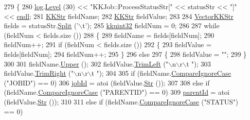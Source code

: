 \begin{DoxyCode}
279 \{
280   \hyperlink{class_k_k_job_managment_1_1_k_k_job_ad2466a68d9a01778e0f08af0478b94e5}{log}.\hyperlink{class_k_k_b_1_1_run_log_a32cf761d7f2e747465fd80533fdbb659}{Level} (30) << \textcolor{stringliteral}{"KKJob::ProcessStatusStr["} << statusStr << \textcolor{stringliteral}{"]"} << 
      \hyperlink{namespace_k_k_b_ad1f50f65af6adc8fa9e6f62d007818a8}{endl};
281   \hyperlink{class_k_k_b_1_1_k_k_str}{KKStr}  fieldName;
282   \hyperlink{class_k_k_b_1_1_k_k_str}{KKStr}  fieldValue;
283 
284   \hyperlink{class_k_k_b_1_1_vector_k_k_str}{VectorKKStr} fields = statusStr.\hyperlink{class_k_k_b_1_1_k_k_str_ac06a219a8773d97383baef7cb10ab091}{Split} (\textcolor{charliteral}{'\(\backslash\)t'});
285   \hyperlink{namespace_k_k_b_af8d832f05c54994a1cce25bd5743e19a}{kkuint32}  fieldNum = 0;
286 
287   \textcolor{keywordflow}{while}  (fieldNum < fields.size ())
288   \{
289     fieldName = fields[fieldNum];
290     fieldNum++;
291     \textcolor{keywordflow}{if}  (fieldNum < fields.size ())
292     \{
293       fieldValue = fields[fieldNum];
294       fieldNum++;
295     \}
296     \textcolor{keywordflow}{else}
297     \{
298       fieldValue = \textcolor{stringliteral}{""};
299     \}
300 
301     fieldName.\hyperlink{class_k_k_b_1_1_k_k_str_a66ea0feabc94da88591b56a683695bd9}{Upper} ();
302     fieldValue.\hyperlink{class_k_k_b_1_1_k_k_str_af7c102c53103ddff3f48270b4a198c89}{TrimLeft} (\textcolor{stringliteral}{"\(\backslash\)n\(\backslash\)r\(\backslash\)t "});
303     fieldValue.\hyperlink{class_k_k_b_1_1_k_k_str_aa912161f17871e2d6fec7bbac033221c}{TrimRight} (\textcolor{stringliteral}{"\(\backslash\)n\(\backslash\)r\(\backslash\)t "});
304 
305     \textcolor{keywordflow}{if}  (fieldName.\hyperlink{class_k_k_b_1_1_k_k_str_a3fd779d448f27e24170c9c05fca5208e}{CompareIgnoreCase} (\textcolor{stringliteral}{"JOBID"}) == 0)
306       \hyperlink{class_k_k_job_managment_1_1_k_k_job_a655535952219853be0aea068e60c974b}{jobId} = atoi (fieldValue.\hyperlink{class_k_k_b_1_1_k_k_str_ad574e6c0fe7f6ce1ba3ab0a8ce2fbd52}{Str} ());
307 
308     \textcolor{keywordflow}{else}  \textcolor{keywordflow}{if}  (fieldName.\hyperlink{class_k_k_b_1_1_k_k_str_a3fd779d448f27e24170c9c05fca5208e}{CompareIgnoreCase} (\textcolor{stringliteral}{"PARENTID"}) == 0)
309       \hyperlink{class_k_k_job_managment_1_1_k_k_job_a2623203d948d2e6348f7edc572e6abb4}{parentId} = atoi (fieldValue.\hyperlink{class_k_k_b_1_1_k_k_str_ad574e6c0fe7f6ce1ba3ab0a8ce2fbd52}{Str} ());
310 
311     \textcolor{keywordflow}{else}  \textcolor{keywordflow}{if}  (fieldName.\hyperlink{class_k_k_b_1_1_k_k_str_a3fd779d448f27e24170c9c05fca5208e}{CompareIgnoreCase} (\textcolor{stringliteral}{"STATUS"}) == 0)

\end{DoxyCode}
